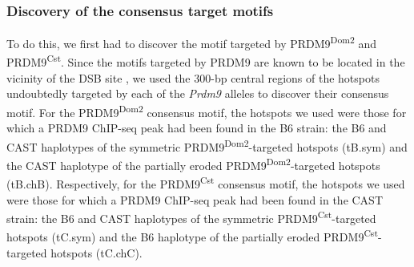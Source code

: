 \subsubsection{Discovery of the consensus target motifs}
To do this, we first had to discover the motif targeted by PRDM9\textsuperscript{Dom2} and PRDM9\textsuperscript{Cst}.
Since the motifs targeted by PRDM9 are known to be located in the vicinity of the DSB site \citep{brick2012genetic, baker2014prdm9}, we used the 300-bp central regions of the hotspots undoubtedly targeted by each of the \textit{Prdm9} alleles to discover their consensus motif.
For the PRDM9\textsuperscript{Dom2} consensus motif, the hotspots we used were those for which a PRDM9 ChIP-seq peak had been found in the B6 strain:
the B6 and CAST haplotypes of the symmetric PRDM9\textsuperscript{Dom2}-targeted hotspots (tB.sym) and the CAST haplotype of the partially eroded PRDM9\textsuperscript{Dom2}-targeted hotspots (tB.chB).
Respectively, for the PRDM9\textsuperscript{Cst} consensus motif, the hotspots we used were those for which a PRDM9 ChIP-seq peak had been found in the CAST strain:
the B6 and CAST haplotypes of the symmetric PRDM9\textsuperscript{Cst}-targeted hotspots (tC.sym) and the B6 haplotype of the partially eroded PRDM9\textsuperscript{Cst}-targeted hotspots (tC.chC).

%
%


